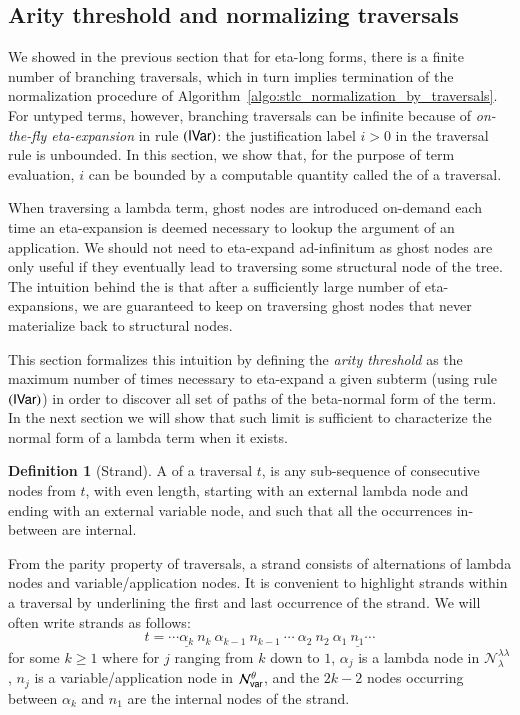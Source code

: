 \documentclass{elsarticle}
\theoremstyle{plain}
\theoremstyle{definition}
\newtheorem{definition}{Definition}[section]
\theoremstyle{remark}
\newcommand\Nodes{\mathcal{N}}%
\newcommand\NodesVar{\Nodes_{\sf var}}%
\newcommand\NodesLmd{\Nodes_\lambda}%
\newcommand{\ghostlmd}{{\lambda\!\!\lambda}}
\newcommand{\ghostvar}{\theta}
\newcommand\ImNodesVar{\NodesVar^\ghostvar}
\newcommand\ImNodesLmd{\NodesLmd^\ghostlmd}
\begin{document}
\subsection{Arity threshold and normalizing traversals}

We showed in the previous section that for eta-long forms, there is a finite number of branching traversals, which in turn implies termination of the normalization procedure of Algorithm~\ref{algo:stlc_normalization_by_traversals}. For untyped terms, however, branching traversals can be infinite because of \emph{on-the-fly eta-expansion} in rule $\mathbf{({\sf IVar})}$: the justification label $i>0$ in the traversal rule is unbounded. In this section, we show that, for the purpose of term evaluation, $i$ can be bounded by a computable quantity called the  of a traversal.

When traversing a lambda term, ghost nodes are introduced on-demand each time an eta-expansion is deemed necessary to lookup the argument of an application.
We should not need to eta-expand ad-infinitum as ghost nodes are only useful if they eventually lead to traversing some structural node of the tree. The intuition behind the  is that after a sufficiently large number of eta-expansions, we are guaranteed to keep on traversing ghost nodes that never materialize back to structural nodes.

This section formalizes this intuition by defining the \emph{arity threshold} as the maximum number of times necessary to eta-expand a given subterm (using rule $\mathbf{({\sf IVar})}$)  in order to discover all set of paths of the beta-normal form of the term. In the next section we will show that such limit is sufficient to characterize the normal form of a lambda term when it exists.

\begin{definition}[Strand]
\label{ref:strand}
A  of a traversal $t$, is any sub-sequence of consecutive nodes from $t$,
with even length, starting with an external lambda node and ending with an external variable node, and such that all the occurrences in-between are internal.
\end{definition}

From the parity property of traversals, a strand consists of alternations of lambda nodes and variable/application nodes. It is convenient to highlight strands within a traversal by underlining the first and last occurrence of the strand. We will often write strands as follows:
$$ t = \cdots \underline{\alpha_k}\ n_k\ \alpha_{k-1}\ n_{k-1}\ \cdots\ \alpha_2\ n_2\ \alpha_1\ \underline{n_1} \cdots $$
for some $k\geq 1$ where for $j$ ranging from $k$ down to $1$, $\alpha_j$ is a lambda node in $\ImNodesLmd$, $n_j$ is a variable/application node in $\ImNodesVar$,
and the $2k-2$ nodes occurring  between $\alpha_k$ and $n_1$ are the internal nodes of the strand.
\end{document}
